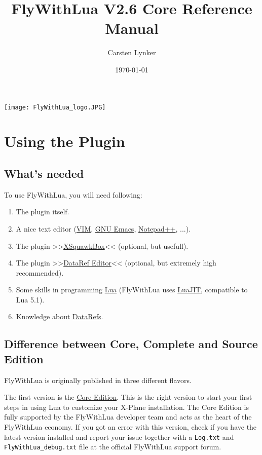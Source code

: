 \documentclass[11pt,parskip=half,a4paper]{scrartcl}
\begin{document}
\title{FlyWithLua V2.6 Core Reference Manual}
\author{Carsten Lynker}
\date{\today}

\maketitle
\vspace{2cm}

\begin{center}
\texttt{[image: FlyWithLua\_logo.JPG]}
\end{center}
\thispagestyle{empty}
\newpage
\verb||
\tableofcontents

\newpage
\section{Using the Plugin}
\subsection{What's needed}

To use FlyWithLua, you will need following:

\begin{enumerate}
\item The plugin itself.
\item A nice text editor (\href{http://www.vim.org/}{VIM}, \href{http://www.gnu.org/software/emacs/}{GNU Emacs}, \href{http://notepad-plus-plus.org/}{Notepad++}, ...).
\item The plugin >>\href{http://www.xsquawkbox.net/xsb/}{XSquawkBox}<< (optional, but usefull).
\item The plugin >>\href{http://wiki.x-plane.com/DataRefEditor}{DataRef Editor}<< (optional, but extremely high recommended).
\item Some skills in programming \href{http://www.lua.org}{Lua} (FlyWithLua uses \href{http://luajit.org/}{LuaJIT}, compatible to Lua 5.1).
\item Knowledge about \href{http://www.xsquawkbox.net/xpsdk/docs/DataRefs.html}{DataRefs}.
\end{enumerate}

\subsection{Difference between Core, Complete and Source Edition}

FlyWithLua is originally published in three different flavors.

The first version is the \href{http://forums.x-plane.org/index.php?/files/file/35579-flywithlua-core-edition-for-x-plane-11-windows-linux-mac-os-x-version/}{Core Edition}. This is the right version to start your first steps in using Lua to customize your X-Plane installation. The Core Edition is fully supported by the FlyWithLua developer team and acts as the heart of the FlyWithLua economy. If you got an error with this version, check if you have the latest version installed and report your issue together with a \verb|Log.txt| and \verb|FlyWithLua_debug.txt| file at the official FlyWithLua support forum.
\end{document}

